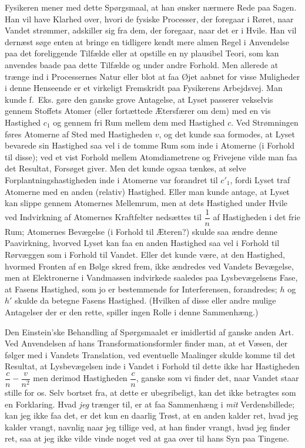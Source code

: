 \documentclass[12pt,a4paper]{article}
\newcommand{\opage}[1]{\marginnote{\footnotesize\textit{[#1]}}}
\begin{document}
Fysikeren mener med dette Spørgsmaal, at han ønsker nærmere Rede paa Sagen. Han
vil have Klarhed over, hvori de fysiske Processer, der foregaar i Røret, naar
Vandet strømmer, adskiller sig fra dem, der foregaar, naar det er i Hvile. Han
vil dernæst søge enten
\opage{9} at bringe en tidligere kendt mere almen Regel i Anvendelse paa det foreliggende
Tilfælde eller at opstille en ny plausibel Teori, som kan anvendes baade paa
dette Tilfælde og under andre Forhold. Men allerede at trænge ind i
Processernes Natur eller blot at faa Øjet aabnet for visse Muligheder i denne
Henseende er et virkeligt Fremskridt paa Fysikerens Arbejdsvej. Man kunde
f.~Eks. gøre den ganske grove Antagelse, at Lyset passerer vekselvis gennem
Stoffets Atomer (eller fortættede Ætersfærer om dem) med en vis Hastighed
$c_{1}$ og gennem fri Rum mellem dem med Hastighed $c$. Ved Strømningen føres
Atomerne af Sted med Hastigheden $v$, og det kunde saa formodes, at Lyset
bevarede sin Hastighed saa vel i de tomme Rum som inde i Atomerne (i Forhold
til disse); ved et vist Forhold mellem \guillemotright
Atomdiametrene\guillemotleft{} og \guillemotright Frivejene\guillemotleft{}
vilde man faa det Resultat, Forsøget giver. Men det kunde ogsaa tænkes, at
selve Forplantningshastigheden inde i Atomerne var forandret til $c'_{1}$,
fordi Lyset traf Atomerne med en anden (relativ) Hastighed. Eller man kunde
antage, at Lyset kan slippe gennem Atomernes Mellemrum, men at dets Hastighed
under Hvile ved Indvirkning af Atomernes \guillemotright
Kraftfelter\guillemotleft{} nedsættes til $\dfrac{1}{n}$ af Hastigheden i det
frie Rum; Atomernes Bevægelse (i Forhold til Æteren?) skulde saa ændre denne
Paavirkning, hvorved Lyset kan faa en anden Hastighed saa vel i Forhold til
Rørvæggen som i Forhold til Vandet. Eller det kunde være, at den Hastighed,
hvormed Fronten af en Bølge skred frem, ikke ændredes ved Vandets Bevægelse,
men at Elektronerne i Vandmassen indvirkede saaledes paa Lysbevægelsens Fase,
at \guillemotright Fasens Hastighed\guillemotleft, som jo er bestemmende for
Interferensen, forandredes; $h$ og $h'$ skulde da betegne Fasens Hastighed.
(Hvilken af disse eller andre mulige Antagelser der er den rette, spiller ingen
Rolle i denne Sammenhæng.)

Den Einstein'ske Behandling af Spørgsmaalet er imidlertid af ganske anden Art.
Ved Anvendelsen af hans Transformationsformler finder man, at et Væsen, der
følger med i Vandets Translation, ved eventuelle Maalinger skulde komme til det
Resultat, at Lysbevægelsen inde i Vandet i Forhold til dette ikke har
Hastigheden $\dfrac{c}{n} - \dfrac{v}{n^{2}}$ men derimod Hastigheden
$\dfrac{c}{n}$, ganske som vi finder det, naar Vandet staar stille for os. Selv
bortset fra, at dette er ubegribeligt, kan det ikke
\opage{10} betragtes som en Forklaring. Hvad \emph{jeg} trænger til, er at faa
Sammenhæng i \emph{mit} Verdensbillede; kan jeg ikke faa det, er det kun en
daarlig Trøst, at en anden kalder ret, hvad jeg kalder vrangt, navnlig naar jeg
tillige ved, at han finder vrangt, hvad jeg finder ret, saa at jeg ikke vilde
vinde noget ved at gaa over til hans Syn paa Tingene.
\end{document}
